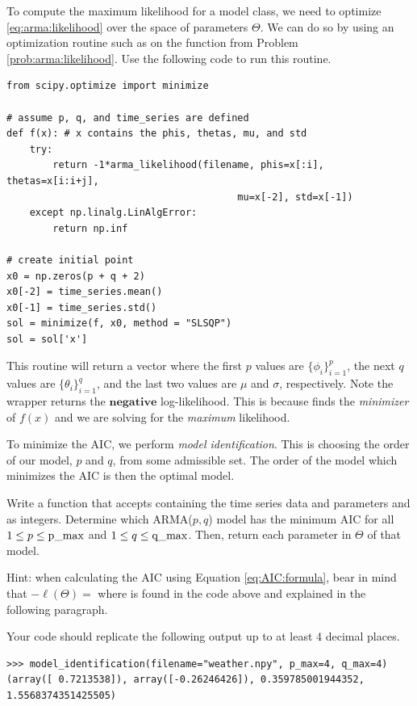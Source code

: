 To compute the maximum likelihood for a model class, we need to optimize
\ref{eq:arma:likelihood} over the space of parameters $\Theta$. We can do so
by using an optimization routine such as  on the function  from Problem \ref{prob:arma:likelihood}.
Use the following code to run this routine.

\begin{lstlisting}
from scipy.optimize import minimize

# assume p, q, and time_series are defined
def f(x): # x contains the phis, thetas, mu, and std
    try:
        return -1*arma_likelihood(filename, phis=x[:i], thetas=x[i:i+j],
                                        mu=x[-2], std=x[-1])
    except np.linalg.LinAlgError:
        return np.inf

# create initial point
x0 = np.zeros(p + q + 2)
x0[-2] = time_series.mean()
x0[-1] = time_series.std()
sol = minimize(f, x0, method = "SLSQP")
sol = sol['x']
\end{lstlisting}

This routine will return a vector  where the first $p$ values are $\{\phi_i\}_{i=1}^p$, the next $q$ values are $\{\theta_i\}_{i=1}^q$, and the last two values are $\mu$ and $\sigma$, respectively.
Note the wrapper  returns the $\mathbf{negative}$ log-likelihood.
This is because  finds the \emph{minimizer} of $f(x)$ and we are solving for the \emph{maximum} likelihood.

To minimize the AIC, we perform \emph{model identification}.
This is choosing the order of our model, $p$ and $q$, from some admissible set.
The order of the model which minimizes the AIC is then the optimal model.

\begin{problem}
\label{prob:model-identification}
Write a function  that accepts  containing the time series data and parameters  and  as integers.
Determine which ARMA($p,q$) model has the minimum AIC for all $1\leq p \leq \text{\li{p_max}}$ and $1\leq q \leq \text{\li{q_max}}$.
Then, return each parameter in $\Theta$ of that model.

\noindent Hint: when calculating the AIC using Equation \ref{eq:AIC:formula}, bear in mind that $-\ell(\Theta)=$  where  is found in the code above and explained in the following paragraph.

Your code should replicate the following output up to at least 4 decimal places.
\begin{lstlisting}
>>> model_identification(filename="weather.npy", p_max=4, q_max=4)
(array([ 0.7213538]), array([-0.26246426]), 0.359785001944352, 1.5568374351425505)
\end{lstlisting}
\end{problem}

